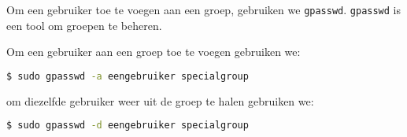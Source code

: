 Om een gebruiker toe te voegen aan een groep, gebruiken we \texttt{gpasswd}.  \texttt{gpasswd} is een tool om groepen te beheren.

Om een gebruiker aan een groep toe te voegen gebruiken we:
\begin{lstlisting}[language=bash]
$ sudo gpasswd -a eengebruiker specialgroup
\end{lstlisting}
om diezelfde gebruiker weer uit de groep te halen gebruiken we:
\begin{lstlisting}[language=bash]
$ sudo gpasswd -d eengebruiker specialgroup
\end{lstlisting}

